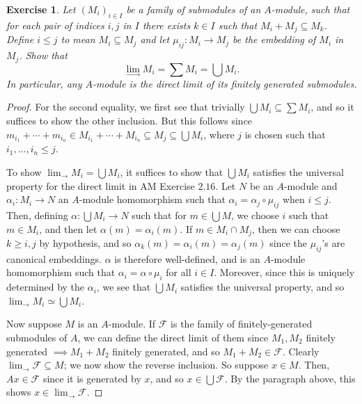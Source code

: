 \documentclass[12pt,letterpaper]{article}
\newtheorem{problem}{Exercise}[section]
\theoremstyle{definition}
\theoremstyle{remark}
\numberwithin{figure}{problem}
\numberwithin{equation}{section}
\begin{document}
\begin{problem}
  Let
  $(M_i)_{i \in
    I}$ be a family of submodules of an
  $A$-module, such that for each pair of indices
  $i,j$ in
  $I$ there exists
  $k \in
  I$ such that
  $M_i + M_j \subseteq
  M_k$.
  Define
  $i \le
  j$ to mean
  $M_i \subseteq
  M_j$ and let
  $\mu_{ij} \colon M_i \to
  M_j$ be the embedding of
  $M_i$ in
  $M_j$.
  Show that
  \begin{equation*}
    \lim_{\longrightarrow} M_i = \sum M_i = \bigcup M_i.
  \end{equation*}
  In particular, any
  $A$-module is the direct limit of its finitely generated submodules.
\end{problem}
\begin{proof}
  For the second equality, we first see that trivially
  $\bigcup M_i \subseteq \sum
  M_i$, and so it suffices to show the other inclusion.
  But this follows since
  $m_{i_1} + \cdots + m_{i_n} \in M_{i_1} + \cdots + M_{i_n} \subseteq M_j \subseteq \bigcup
  M_i$, where
  $j$ is chosen such that
  $i_1,\ldots,i_n \le
  j$.
  \par To show
  $\displaystyle\lim_{\longrightarrow} M_i = \bigcup
  M_i$, it suffices to show that
  $\bigcup
  M_i$ satisfies the universal property for the direct limit in AM Exercise
  $2.16$.
  Let
  $N$ be an
  $A$-module and
  $\alpha_i : M_i \to
  N$ an
  $A$-module homomorphism such that
  $\alpha_i = \alpha_j \circ
  \mu_{ij}$ when
  $i \le
  j$.
  Then, defining
  $\alpha : \bigcup M_i \to
  N$ such that for
  $m \in \bigcup
  M$, we choose
  $i$ such that
  $m \in
  M_i$, and then let
  $\alpha(m) =
  \alpha_i(m)$.
  If
  $m \in M_i \cap
  M_j$, then we can choose
  $k \geqslant
  i,j$ by hypothesis, and so
  $\alpha_k(m) = \alpha_i(m) =
  \alpha_j(m)$ since the
  $\mu_{ij}$'s are canonical embeddings.
  $\alpha$ is therefore well-defined, and is an
  $A$-module homomorphism such that
  $\alpha_i = \alpha \circ
  \mu_i$ for all
  $i \in
  I$.
  Moreover, since this is uniquely determined by the
  $\alpha_i$, we see that
  $\bigcup
  M_i$ satisfies the universal property, and so
  $\displaystyle\lim_{\longrightarrow} M_i \simeq \bigcup
  M_i$.
  \par Now suppose
  $M$ is an
  $A$-module.
  If
  $\mathcal{F}$ is the family of finitely-generated submodules of
  $A$, we can define the direct limit of them since
  $M_1,M_2$ finitely generated
  $\implies M_1 +
  M_2$ finitely generated, and so
  $M_1 + M_2 \in
  \mathcal{F}$.
  Clearly
  $\displaystyle\lim_{\longrightarrow} \mathcal{F} \subseteq
  M$; we now show the reverse inclusion.
  So suppose
  $x \in
  M$.
  Then,
  $Ax \in
  \mathcal{F}$ since it is generated by
  $x$, and so
  $x \in \bigcup
  \mathcal{F}$.
  By the paragraph above, this shows
  $x \in \displaystyle\lim_{\longrightarrow}
  \mathcal{F}$.
\end{proof}
\end{document}
